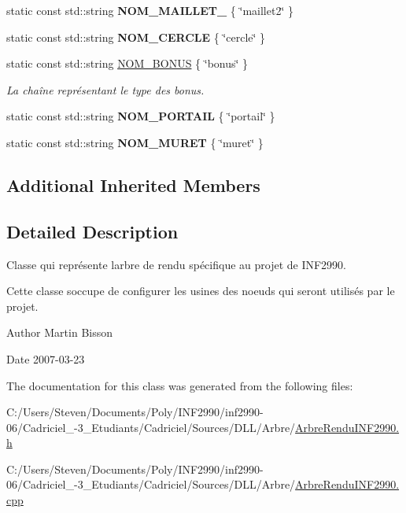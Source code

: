 \begin{DoxyCompactItemize}
static const std\+::string {\bfseries N\+O\+M\+\_\+\+M\+A\+I\+L\+L\+E\+T\+\_} \{ \char`\"{}maillet2\char`\"{} \}
\item 
static const std\+::string {\bfseries N\+O\+M\+\_\+\+C\+E\+R\+C\+LE} \{ \char`\"{}cercle\char`\"{} \}
\item 
static const std\+::string \hyperlink{group__inf2990_gafd57ee426cc672e15633e991ae1af778}{N\+O\+M\+\_\+\+B\+O\+N\+US} \{ \char`\"{}bonus\char`\"{} \}
\begin{DoxyCompactList}\small\item\em La chaîne représentant le type des bonus. \end{DoxyCompactList}\item 
static const std\+::string {\bfseries N\+O\+M\+\_\+\+P\+O\+R\+T\+A\+IL} \{ \char`\"{}portail\char`\"{} \}
\item 
static const std\+::string {\bfseries N\+O\+M\+\_\+\+M\+U\+R\+ET} \{ \char`\"{}muret\char`\"{} \}
\end{DoxyCompactItemize}
\subsection*{Additional Inherited Members}


\subsection{Detailed Description}
Classe qui représente l\textquotesingle{}arbre de rendu spécifique au projet de I\+N\+F2990. 

Cette classe s\textquotesingle{}occupe de configurer les usines des noeuds qui seront utilisés par le projet.

\begin{DoxyAuthor}{Author}
Martin Bisson 
\end{DoxyAuthor}
\begin{DoxyDate}{Date}
2007-\/03-\/23 
\end{DoxyDate}


The documentation for this class was generated from the following files\+:\begin{DoxyCompactItemize}
\item 
C\+:/\+Users/\+Steven/\+Documents/\+Poly/\+I\+N\+F2990/inf2990-\/06/\+Cadriciel\+\_-\/3\+\_\+\+Etudiants/\+Cadriciel/\+Sources/\+D\+L\+L/\+Arbre/\hyperlink{_arbre_rendu_i_n_f2990_8h}{Arbre\+Rendu\+I\+N\+F2990.\+h}\item 
C\+:/\+Users/\+Steven/\+Documents/\+Poly/\+I\+N\+F2990/inf2990-\/06/\+Cadriciel\+\_-\/3\+\_\+\+Etudiants/\+Cadriciel/\+Sources/\+D\+L\+L/\+Arbre/\hyperlink{_arbre_rendu_i_n_f2990_8cpp}{Arbre\+Rendu\+I\+N\+F2990.\+cpp}\end{DoxyCompactItemize}

